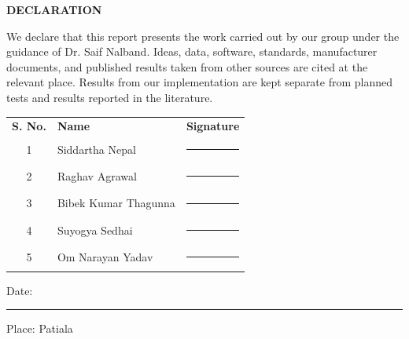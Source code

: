 \begin{center}
{\Large\textbf{DECLARATION}}\\
\vspace{0.8cm}
\end{center}

We declare that this report presents the work carried out by our group under
the guidance of Dr. Saif Nalband. Ideas, data, software, standards,
manufacturer documents, and published results taken from other sources are
cited at the relevant place. Results from our implementation are kept separate
from planned tests and results reported in the literature.

\vspace{0.65in}
\noindent
\begin{tabularx}{\textwidth}{c X X}
\textbf{S. No.} & \textbf{Name} & \textbf{Signature}\\[0.10in]
1 & Siddartha Nepal & \rule{1.3in}{0.4pt}\\[0.20in]
2 & Raghav Agrawal & \rule{1.3in}{0.4pt}\\[0.20in]
3 & Bibek Kumar Thagunna & \rule{1.3in}{0.4pt}\\[0.20in]
4 & Suyogya Sedhai & \rule{1.3in}{0.4pt}\\[0.20in]
5 & Om Narayan Yadav & \rule{1.3in}{0.4pt}
\end{tabularx}

\vfill
\noindent Date: \rule{1.6in}{0.4pt}\hfill Place: Patiala
\clearpage
